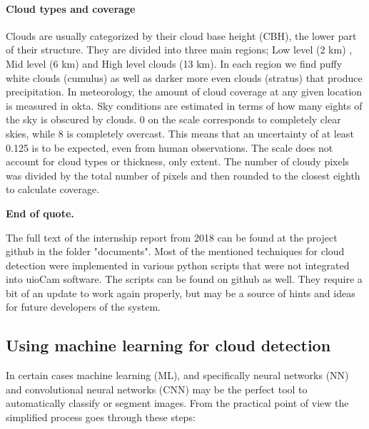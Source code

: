\documentclass[]{book}
\begin{document}
		\paragraph{Cloud types and coverage}
		Clouds are usually categorized by their cloud base height (CBH), the lower part of their structure. They are divided into three main regions; Low level (2 km) , Mid level (6 km) and High level clouds (13 km). In each region we find puffy white clouds (cumulus) as well as darker more even clouds (stratus) that produce precipitation.
		In meteorology, the amount of cloud coverage at any given location is measured in okta. Sky conditions are estimated in terms of how many eights of the sky is obscured by clouds. 0 on the scale corresponds to completely clear skies, while 8 is completely overcast. This means that an uncertainty of at least 0.125 is to be expected, even from human observations. The scale does not account for cloud types or thickness, only extent.
		The number of cloudy pixels was divided by the total number of pixels and then rounded to the closest eighth to calculate coverage.
		
		\textbf{End of quote.} 
		
		The full text of the internship report from 2018 can be found at the project github in the folder "documents". Most of the mentioned techniques for cloud detection were implemented in various python scripts that were not integrated into uioCam software. The scripts can be found on github as well. They require a bit of an update to work again properly, but may be a source of hints and ideas for future developers of the system.
		
		\subsection{Using machine learning for cloud detection}
		
		In certain cases machine learning (ML), and specifically neural networks (NN) and convolutional neural networks (CNN) may be the perfect tool to automatically classify or segment images. From the practical point of view the simplified process goes through these steps:
		
\end{document}
